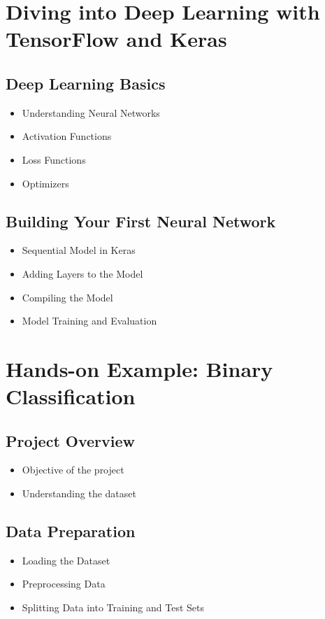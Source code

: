 \documentclass[a4paper,12pt]{book}
\begin{document}
\chapter{Diving into Deep Learning with TensorFlow and Keras}

\section{Deep Learning Basics}
\begin{itemize}
    \item Understanding Neural Networks
    \item Activation Functions
    \item Loss Functions
    \item Optimizers
\end{itemize}

\section{Building Your First Neural Network}
\begin{itemize}
    \item Sequential Model in Keras
    \item Adding Layers to the Model
    \item Compiling the Model
    \item Model Training and Evaluation
\end{itemize}

\chapter{Hands-on Example: Binary Classification}

\section{Project Overview}
\begin{itemize}
    \item Objective of the project
    \item Understanding the dataset
\end{itemize}

\section{Data Preparation}
\begin{itemize}
    \item Loading the Dataset
    \item Preprocessing Data
    \item Splitting Data into Training and Test Sets
\end{itemize}
\end{document}
